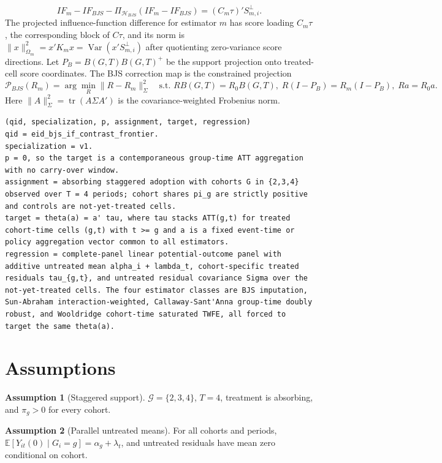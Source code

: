 \documentclass[11pt]{article}
\newcommand{\E}{\mathbb{E}}
\theoremstyle{definition}
\newtheorem{assumption}{Assumption}
\theoremstyle{plain}
\theoremstyle{remark}
\begin{document}
\[
IF_m-IF_{BJS}-\Pi_{\mathcal H_{BJS}}(IF_m-IF_{BJS})=(C_m\tau)'S_{m,i}^{\perp}.
\]
The projected influence-function difference for estimator \(m\) has score loading \(C_m\tau\), the corresponding block of \(C\tau\), and its norm is \(\|x\|_{\Omega_m}^2=x'K_mx=\operatorname{Var}(x'S_{m,i}^{\perp})\) after quotienting zero-variance score directions. Let \(P_B=B(G,T)B(G,T)^+\) be the support projection onto treated-cell score coordinates. The BJS correction map is the constrained projection
\[
\mathcal P_{BJS}(R_m)=\arg\min_R \|R-R_m\|_{\Sigma}^{2}\quad
\text{s.t. } RB(G,T)=R_0B(G,T),\; R(I-P_B)=R_m(I-P_B),\; Ra=R_0a.
\]
Here \(\|A\|_\Sigma^2=\operatorname{tr}(A\Sigma A')\) is the covariance-weighted Frobenius norm.

\begin{verbatim}
(qid, specialization, p, assignment, target, regression)
qid = eid_bjs_if_contrast_frontier.
specialization = v1.
p = 0, so the target is a contemporaneous group-time ATT aggregation with no carry-over window.
assignment = absorbing staggered adoption with cohorts G in {2,3,4} observed over T = 4 periods; cohort shares pi_g are strictly positive and controls are not-yet-treated cells.
target = theta(a) = a' tau, where tau stacks ATT(g,t) for treated cohort-time cells (g,t) with t >= g and a is a fixed event-time or policy aggregation vector common to all estimators.
regression = complete-panel linear potential-outcome panel with additive untreated mean alpha_i + lambda_t, cohort-specific treated residuals tau_{g,t}, and untreated residual covariance Sigma over the not-yet-treated cells. The four estimator classes are BJS imputation, Sun-Abraham interaction-weighted, Callaway-Sant'Anna group-time doubly robust, and Wooldridge cohort-time saturated TWFE, all forced to target the same theta(a).
\end{verbatim}

\section{Assumptions}
\begin{assumption}[Staggered support]\label{ass:staggered-support}
\(\mathcal G=\{2,3,4\}\), \(T=4\), treatment is absorbing, and \(\pi_g>0\) for every cohort.
\end{assumption}

\begin{assumption}[Parallel untreated means]\label{ass:parallel-untreated}
For all cohorts and periods, \(\E[Y_{it}(0)\mid G_i=g]=\alpha_g+\lambda_t\), and untreated residuals have mean zero conditional on cohort.
\end{assumption}
\end{document}
